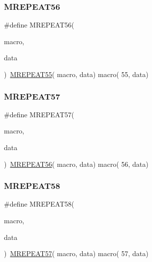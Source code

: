 \mbox{\label{group__group__sam0__utils__mrepeat_ga1f3c1ef60a18b07755f237d441952d34}} 
\subsubsection{\texorpdfstring{MREPEAT56}{MREPEAT56}}
{\footnotesize\ttfamily \#define M\+R\+E\+P\+E\+A\+T56(\begin{DoxyParamCaption}\item[{}]{macro,  }\item[{}]{data }\end{DoxyParamCaption})~\mbox{\hyperlink{group__group__sam0__utils__mrepeat_ga43d357d7b292b560fb1a49f4778f56e8}{M\+R\+E\+P\+E\+A\+T55}}( macro, data)   macro( 55, data)}

\mbox{\label{group__group__sam0__utils__mrepeat_ga6c79341e638712e4f76cfa03b92acba3}} 
\subsubsection{\texorpdfstring{MREPEAT57}{MREPEAT57}}
{\footnotesize\ttfamily \#define M\+R\+E\+P\+E\+A\+T57(\begin{DoxyParamCaption}\item[{}]{macro,  }\item[{}]{data }\end{DoxyParamCaption})~\mbox{\hyperlink{group__group__sam0__utils__mrepeat_ga1f3c1ef60a18b07755f237d441952d34}{M\+R\+E\+P\+E\+A\+T56}}( macro, data)   macro( 56, data)}

\mbox{\label{group__group__sam0__utils__mrepeat_ga36b3ee8ed153de1e332867165d8bd129}} 
\subsubsection{\texorpdfstring{MREPEAT58}{MREPEAT58}}
{\footnotesize\ttfamily \#define M\+R\+E\+P\+E\+A\+T58(\begin{DoxyParamCaption}\item[{}]{macro,  }\item[{}]{data }\end{DoxyParamCaption})~\mbox{\hyperlink{group__group__sam0__utils__mrepeat_ga6c79341e638712e4f76cfa03b92acba3}{M\+R\+E\+P\+E\+A\+T57}}( macro, data)   macro( 57, data)}

